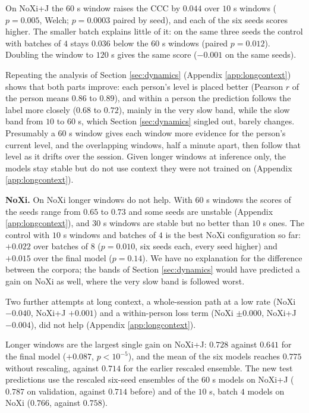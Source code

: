 \documentclass[10pt,a4paper,twocolumn]{article}
\begin{document}
	On NoXi+J the $60$ s window raises the CCC by $0.044$ over $10$ s windows ($p = 0.005$, Welch; $p = 0.0003$ paired by seed), and each of the six seeds scores higher. The smaller batch explains little of it: on the same three seeds the control with batches of $4$ stays $0.036$ below the $60$ s windows (paired $p = 0.012$). Doubling the window to $120$ s gives the same score ($-0.001$ on the same seeds).

	Repeating the analysis of Section \ref{sec:dynamics} (Appendix \ref{app:longcontext}) shows that both parts improve: each person's level is placed better (Pearson $r$ of the person means $0.86$ to $0.89$), and within a person the prediction follows the label more closely ($0.68$ to $0.72$), mainly in the very slow band, while the slow band from $10$ to $60$ s, which Section \ref{sec:dynamics} singled out, barely changes. Presumably a $60$ s window gives each window more evidence for the person's current level, and the overlapping windows, half a minute apart, then follow that level as it drifts over the session. Given longer windows at inference only, the models stay stable but do not use context they were not trained on (Appendix \ref{app:longcontext}).

	\textbf{NoXi.} On NoXi longer windows do not help. With $60$ s windows the scores of the seeds range from $0.65$ to $0.73$ and some seeds are unstable (Appendix \ref{app:longcontext}), and $30$ s windows are stable but no better than $10$ s ones. The control with $10$ s windows and batches of $4$ is the best NoXi configuration so far: $+0.022$ over batches of $8$ ($p = 0.010$, six seeds each, every seed higher) and $+0.015$ over the final model ($p = 0.14$). We have no explanation for the difference between the corpora; the bands of Section \ref{sec:dynamics} would have predicted a gain on NoXi as well, where the very slow band is followed worst.

	Two further attempts at long context, a whole-session path at a low rate (NoXi $-0.040$, NoXi+J $+0.001$) and a within-person loss term (NoXi $\pm 0.000$, NoXi+J $-0.004$), did not help (Appendix \ref{app:longcontext}).

	Longer windows are the largest single gain on NoXi+J: $0.728$ against $0.641$ for the final model ($+0.087$, $p < 10^{-5}$), and the mean of the six models reaches $0.775$ without rescaling, against $0.714$ for the earlier rescaled ensemble. The new test predictions use the rescaled six-seed ensembles of the $60$ s models on NoXi+J ($0.787$ on validation, against $0.714$ before) and of the $10$ s, batch $4$ models on NoXi ($0.766$, against $0.758$).
\end{document}
